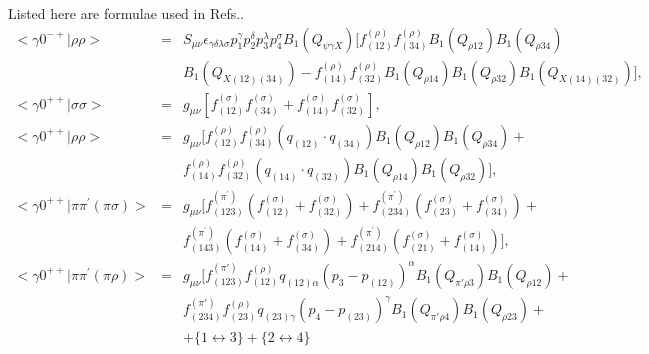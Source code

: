 Listed here are formulae used in Refs.\cite{BES4,Scott}.
\begin{eqnarray}
<\gamma 0^{-+}|\rho\rho> \!&=&\! S_{\mu\nu}
\epsilon_{\gamma\delta\lambda\sigma}p_1^\gamma p_2^\delta
p_3^\lambda p_4^\sigma B_1(Q_{\psi\gamma X})
[f_{(12)}^{(\rho)}f_{(34)}^{(\rho)} B_1(Q_{\rho 12}) B_1(Q_{\rho
34}) \nonumber \\
&   &  B_1(Q_{X(12)(34)}) - f_{(14)}^{(\rho)}f_{(32)}^{(\rho)}
B_1(Q_{\rho 14})
B_1(Q_{\rho 32})B_1(Q_{X(14)(32)})], \\
<\gamma 0^{++}|\sigma\sigma>
                  \!&=&\!g_{\mu\nu}[f_{(12)}^{(\sigma)}
                         f_{(34)}^{(\sigma)} +
                         f_{(14)}^{(\sigma)}f_{(32)}^{(\sigma)}], \\
<\gamma 0^{++}|\rho\rho>  \!&=&\! g_{\mu\nu}[f_{(12)}^{(\rho)}
                         f_{(34)}^{(\rho)}(q_{(12)}\!\cdot\! q_{(34)})
                         B_1(Q_{\rho 12})B_1(Q_{\rho 34}) + \nonumber \\
                   &   & f_{(14)}^{(\rho)}f_{(32)}^{(\rho)}
                              (q_{(14)}\!\cdot\! q_{(32)})
                         B_1(Q_{\rho 14})B_1(Q_{\rho 32})], \\
<\gamma 0^{++}|\pi\pi^{\prime}(\pi\sigma)>
                  \!&=&\! g_{\mu\nu}
                         [f_{(123)}^{(\pi^{\prime})}
                         (f_{(12)}^{(\sigma)} + f_{(32)}^{(\sigma)}) +
                          f_{(234)}^{(\pi^{\prime})}
                         (f_{(23)}^{(\sigma)} + f_{(34)}^{(\sigma)}) +
                         \nonumber \\
                   &   & f_{(143)}^{(\pi^{\prime})}
                         (f_{(14)}^{(\sigma)} + f_{(34)}^{(\sigma)}) +
                          f_{(214)}^{(\pi^{\prime})}
                         (f_{(21)}^{(\sigma)} +
                         f_{(14)}^{(\sigma)})],
                         \\
<\gamma 0^{++}|\pi\pi^{\prime}(\pi\rho)>
                  \!&=&\!g_{\mu\nu}[f_{(123)}^{(\pi')}f_{(12)}^{(\rho)}
                          q_{(12)\alpha}(p_3-p_{(12)})^{\alpha}
                         B_1(Q_{\pi'\rho 3})B_1(Q_{\rho 12}) +
                         \nonumber \\
                   &   &  f_{(234)}^{(\pi')}f_{(23)}^{(\rho)}
                          q_{(23)\gamma}(p_4-p_{(23)})^{\gamma}
                         B_1(Q_{\pi'\rho 4})B_1(Q_{\rho 23}) +
                         \nonumber \\ & &
+\{1\leftrightarrow 3\}+\{2\leftrightarrow 4\}

\end{eqnarray}
